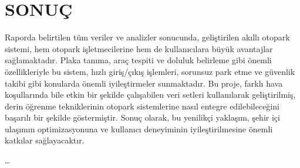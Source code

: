 \documentclass[]{article}
\begin{document}
	\section{SONUÇ}
	Raporda belirtilen tüm veriler ve analizler sonucunda, geliştirilen akıllı otopark sistemi, hem otopark işletmecilerine hem de kullanıcılara büyük avantajlar sağlamaktadır. Plaka tanıma, araç tespiti ve doluluk belirleme gibi önemli özellikleriyle bu sistem, hızlı giriş/çıkış işlemleri, sorunsuz park etme ve güvenlik takibi gibi konularda önemli iyileştirmeler sunmaktadır. Bu proje, farklı hava koşullarında bile etkin bir şekilde çalışabilen veri setleri kullanılarak geliştirilmiş, derin öğrenme tekniklerinin otopark sistemlerine nasıl entegre edilebileceğini başarılı bir şekilde göstermiştir. Sonuç olarak, bu yenilikçi yaklaşım, şehir içi ulaşımın optimizasyonuna ve kullanıcı deneyiminin iyileştirilmesine önemli katkılar sağlayacaktır.
	
	\newpage
	
	
	\dots{}
\end{document}
